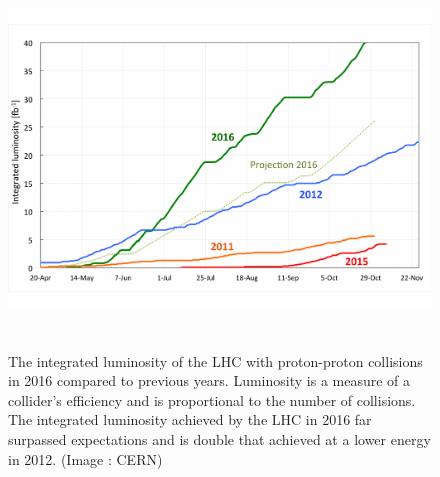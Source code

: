 \begin{figure}[!ht]
  \includegraphics[width=12cm,height=10cm]{figures/lumi-proj-2016-final-v2}
  \caption{The integrated luminosity of the LHC with proton-proton collisions in 2016 compared to previous years. Luminosity is a measure of a collider’s efficiency and is proportional to the number of collisions. The integrated luminosity achieved by the LHC in 2016 far surpassed expectations and is double that achieved at a lower energy in 2012. (Image : CERN)} 
  \label{fig:lumi-proj-2016-final-v2}
\end{figure}
